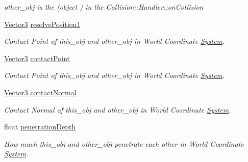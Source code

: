 \begin{DoxyCompactItemize}
\begin{DoxyCompactList}\small\item\em other\+\_\+obj is the (object ) in the Collision\+::\+Handler\+::on\+Collision \end{DoxyCompactList}\item 
\hyperlink{class_i_dream_sky_1_1_vector3}{Vector3} \hyperlink{class_i_dream_sky_1_1_collision_1_1_contact_info_ab4b50d591610b32bae5674b1bf16b5ad}{resolve\+Position1}\hypertarget{class_i_dream_sky_1_1_collision_1_1_contact_info_ab4b50d591610b32bae5674b1bf16b5ad}{}\label{class_i_dream_sky_1_1_collision_1_1_contact_info_ab4b50d591610b32bae5674b1bf16b5ad}

\begin{DoxyCompactList}\small\item\em Contact Point of this\+\_\+obj and other\+\_\+obj in World Coordinate \hyperlink{class_i_dream_sky_1_1_system}{System}. \end{DoxyCompactList}\item 
\hyperlink{class_i_dream_sky_1_1_vector3}{Vector3} \hyperlink{class_i_dream_sky_1_1_collision_1_1_contact_info_a27267458b5d25876b9944bbd184ea3ea}{contact\+Point}\hypertarget{class_i_dream_sky_1_1_collision_1_1_contact_info_a27267458b5d25876b9944bbd184ea3ea}{}\label{class_i_dream_sky_1_1_collision_1_1_contact_info_a27267458b5d25876b9944bbd184ea3ea}

\begin{DoxyCompactList}\small\item\em Contact Point of this\+\_\+obj and other\+\_\+obj in World Coordinate \hyperlink{class_i_dream_sky_1_1_system}{System}. \end{DoxyCompactList}\item 
\hyperlink{class_i_dream_sky_1_1_vector3}{Vector3} \hyperlink{class_i_dream_sky_1_1_collision_1_1_contact_info_ac8d2f8227c37f8f9de5c305d61c01790}{contact\+Normal}\hypertarget{class_i_dream_sky_1_1_collision_1_1_contact_info_ac8d2f8227c37f8f9de5c305d61c01790}{}\label{class_i_dream_sky_1_1_collision_1_1_contact_info_ac8d2f8227c37f8f9de5c305d61c01790}

\begin{DoxyCompactList}\small\item\em Contact Normal of this\+\_\+obj and other\+\_\+obj in World Coordinate \hyperlink{class_i_dream_sky_1_1_system}{System}. \end{DoxyCompactList}\item 
float \hyperlink{class_i_dream_sky_1_1_collision_1_1_contact_info_a0dc37f6d0f80b8212a2ed15123d0fd6e}{penetration\+Depth}\hypertarget{class_i_dream_sky_1_1_collision_1_1_contact_info_a0dc37f6d0f80b8212a2ed15123d0fd6e}{}\label{class_i_dream_sky_1_1_collision_1_1_contact_info_a0dc37f6d0f80b8212a2ed15123d0fd6e}

\begin{DoxyCompactList}\small\item\em How much this\+\_\+obj and other\+\_\+obj penetrate each other in World Coordinate \hyperlink{class_i_dream_sky_1_1_system}{System}. \end{DoxyCompactList}\end{DoxyCompactItemize}


